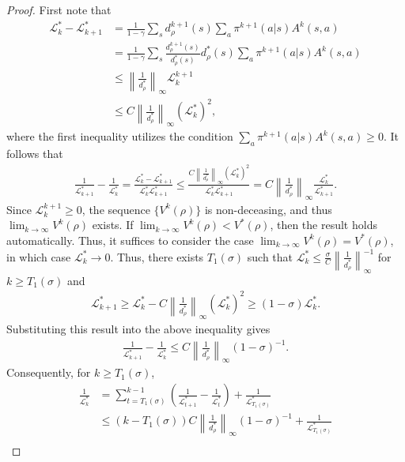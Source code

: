 \begin{proof}
First note that 
\begin{align*}\mathcal{L}_k^*-\mathcal{L}_{k+1}^* & = \frac{1}{1-\gamma}\sum_s d_\rho^{k+1}(s)\sum_a\pi^{k+1}(a|s)A^k(s,a)\\&=\frac{1}{1-\gamma}\sum_s\frac{d_\rho^{k+1}(s)}{d_\rho^*(s)}d_\rho^*(s)\sum_a\pi^{k+1}(a|s)A^k(s,a)\\&\leq \left\|\frac{1}{d_\rho^*}\right\|_\infty\mathcal{L}_k^{k+1}\\&\leq C\left\|\frac{1}{d_\rho^*}\right\|_\infty\left(\mathcal{L}_k^*\right)^2,\end{align*}
where the first inequality utilizes the condition $\sum_a\pi^{k+1}(a|s)A^k(s,a)\geq 0$. It follows that 
\begin{align*}
\frac{1}{\mathcal{L}_{k+1}^*}-\frac{1}{\mathcal{L}_k^*} = \frac{\mathcal{L}_{k}^*-\mathcal{L}_{k+1}^*}{\mathcal{L}_k^*\mathcal{L}_{k+1}^*}\leq \frac{C\left\|\frac{1}{d_\rho^*}\right\|_\infty\left(\mathcal{L}_k^*\right)^2}{\mathcal{L}_k^*\mathcal{L}_{k+1}^*}= C\left\|\frac{1}{d_\rho^*}\right\|_\infty\frac{\mathcal{L}_k^*}{\mathcal{L}_{k+1}^*}.
\end{align*}
Since $\mathcal{L}_k^{k+1}\geq 0$, the sequence $\{V^k(\rho)\}$ is non-deceasing, and thus $\lim_{k\rightarrow\infty} V^k(\rho)$ exists. If $\lim_{k\rightarrow\infty} V^k(\rho)<V^*(\rho)$, then the result holds automatically. Thus, it suffices to consider the case $\lim_{k\rightarrow\infty} V^k(\rho)=V^*(\rho)$, in which case $\mathcal{L}_k^*\rightarrow 0$. Thus, there exists $T_1(\sigma)$ such that $\mathcal{L}_k^*\leq \frac{\sigma}{C}\left\|\frac{1}{d_\rho^*}\right\|_\infty^{-1}$ for $k\geq T_1(\sigma)$ and  
\begin{align*}
\mathcal{L}_{k+1}^*\geq \mathcal{L}_k^*-C\left\|\frac{1}{d_\rho^*}\right\|_\infty\left(\mathcal{L}_k^*\right)^2\geq (1-\sigma)\mathcal{L}_k^*.
\end{align*}
Substituting this result into the above inequality gives 
\begin{align*}
\frac{1}{\mathcal{L}_{k+1}^*}-\frac{1}{\mathcal{L}_k^*}\leq C\left\|\frac{1}{d_\rho^*}\right\|_\infty(1-\sigma)^{-1}.
\end{align*}
Consequently, for $k\geq T_1(\sigma)$,
\begin{align*}
\frac{1}{\mathcal{L}_k^*}&=\sum_{t=T_1(\sigma)}^{k-1}\left(\frac{1}{\mathcal{L}^*_{t+1}}-\frac{1}{\mathcal{L}_t^*}\right)+\frac{1}{\mathcal{L}_{T_1(\sigma)}^*}\\
&\leq (k-T_1(\sigma))C\left\|\frac{1}{d_\rho^*}\right\|_\infty(1-\sigma)^{-1}+\frac{1}{\mathcal{L}_{T_1(\sigma)}^*}\\

\end{align*}
\end{proof}
